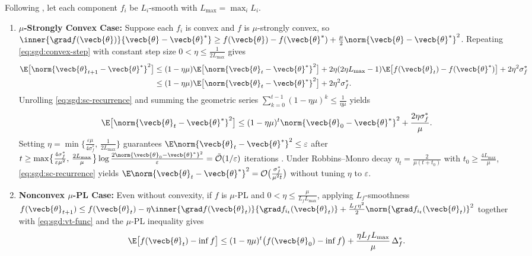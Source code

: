 \documentclass[../../../../master.tex]{subfiles}
\begin{document}
\begin{coremath}
Following , let each component $f_i$ be $L_i$-smooth with $L_{\max} = \max_i L_i$.
\begin{enumerate}
  \item \textbf{$\mu$-Strongly Convex Case:} Suppose each $f_i$ is convex and $f$ is $\mu$-strongly convex, so $\inner{\grad f(\vecb{\theta})}{\vecb{\theta} - \vecb{\theta}^*} \ge f(\vecb{\theta}) - f(\vecb{\theta}^*) + \frac{\mu}{2}\norm{\vecb{\theta} - \vecb{\theta}^*}^2$. Repeating \eqref{eq:sgd:convex-step} with constant step size $0 < \eta \le \frac{1}{2L_{\max}}$ gives
  \begin{align}
  \E\bigl[\norm{\vecb{\theta}_{t+1} - \vecb{\theta}^*}^2\bigr]
  &\le (1 - \eta\mu)\E\bigl[\norm{\vecb{\theta}_t - \vecb{\theta}^*}^2\bigr] + 2\eta(2\eta L_{\max} - 1)\E\bigl[f(\vecb{\theta}_t) - f(\vecb{\theta}^*)\bigr] + 2\eta^2\sigma_f^* \nonumber \\
  &\le (1 - \eta\mu)\E\bigl[\norm{\vecb{\theta}_t - \vecb{\theta}^*}^2\bigr] + 2\eta^2\sigma_f^*. \label{eq:sgd:sc-recurrence}
  \end{align}
  Unrolling \eqref{eq:sgd:sc-recurrence} and summing the geometric series $\sum_{k=0}^{t-1}(1-\eta\mu)^k \le \frac{1}{\eta\mu}$ yields
  \begin{equation}
  \label{eq:sgd:sc-noiseball}
  \E\bigl[\norm{\vecb{\theta}_t - \vecb{\theta}^*}^2\bigr]
  \le (1 - \eta\mu)^t \norm{\vecb{\theta}_0 - \vecb{\theta}^*}^2 + \frac{2\eta \sigma_f^*}{\mu}.
  \end{equation}
  Setting $\eta = \min\bigl\{\frac{\varepsilon\mu}{4\sigma_f^*},\, \frac{1}{2L_{\max}}\bigr\}$ guarantees $\E\norm{\vecb{\theta}_t - \vecb{\theta}^*}^2 \le \varepsilon$ after $t \ge \max\bigl\{\frac{4\sigma_f^*}{\varepsilon\mu^2},\, \frac{2L_{\max}}{\mu}\bigr\}\log\frac{2\norm{\vecb{\theta}_0 - \vecb{\theta}^*}^2}{\varepsilon} = \tilde{\mathcal{O}}(1/\varepsilon)$ iterations . Under Robbins--Monro decay $\eta_t = \frac{2}{\mu(t + t_0)}$ with $t_0 \ge \frac{4L_{\max}}{\mu}$, \eqref{eq:sgd:sc-recurrence} yields $\E\norm{\vecb{\theta}_t - \vecb{\theta}^*}^2 = \mathcal{O}\bigl(\frac{\sigma_f^*}{\mu^2 t}\bigr)$ without tuning $\eta$ to $\varepsilon$.

  \item \textbf{Nonconvex $\mu$-PL Case:} Even without convexity, if $f$ is $\mu$-PL and $0 < \eta \le \frac{\mu}{L_f L_{\max}}$, applying $L_f$-smoothness $f(\vecb{\theta}_{t+1}) \le f(\vecb{\theta}_t) - \eta\inner{\grad f(\vecb{\theta}_t)}{\grad f_{i_t}(\vecb{\theta}_t)} + \frac{L_f \eta^2}{2}\norm{\grad f_{i_t}(\vecb{\theta}_t)}^2$ together with \eqref{eq:sgd:vt-func} and the $\mu$-PL inequality gives
  \begin{equation}
  \label{eq:sgd:pl-noiseball}
  \E\bigl[f(\vecb{\theta}_t) - \inf f\bigr]
  \le (1 - \eta\mu)^t \bigl(f(\vecb{\theta}_0) - \inf f\bigr) + \frac{\eta L_f L_{\max}}{\mu}\,\Delta_f^*.
  \end{equation}
\end{enumerate}
\end{coremath}
\end{document}
